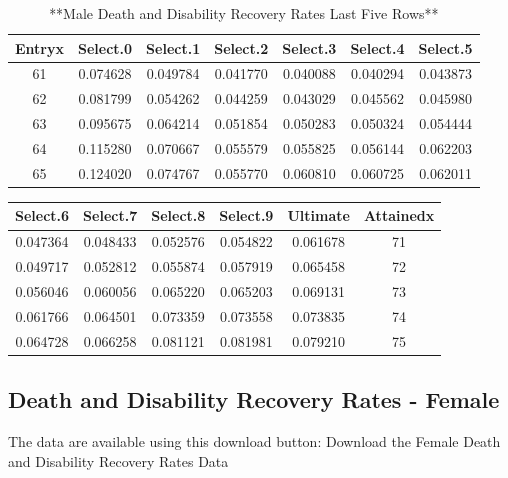 \documentclass[
]{book}
\begin{document}
\begin{table}

\caption{\label{tab:unnamed-chunk-40}**Male Death and Disability Recovery Rates Last Five Rows**}
\centering
\begin{tabular}[t]{c|c|c|c|c|c|c}
\hline
Entryx & Select.0 & Select.1 & Select.2 & Select.3 & Select.4 & Select.5\\
\hline
61 & 0.074628 & 0.049784 & 0.041770 & 0.040088 & 0.040294 & 0.043873\\
\hline
62 & 0.081799 & 0.054262 & 0.044259 & 0.043029 & 0.045562 & 0.045980\\
\hline
63 & 0.095675 & 0.064214 & 0.051854 & 0.050283 & 0.050324 & 0.054444\\
\hline
64 & 0.115280 & 0.070667 & 0.055579 & 0.055825 & 0.056144 & 0.062203\\
\hline
65 & 0.124020 & 0.074767 & 0.055770 & 0.060810 & 0.060725 & 0.062011\\
\hline
\end{tabular}
\end{table}

\begin{tabular}{c|c|c|c|c|c}
\hline
Select.6 & Select.7 & Select.8 & Select.9 & Ultimate & Attainedx\\
\hline
0.047364 & 0.048433 & 0.052576 & 0.054822 & 0.061678 & 71\\
\hline
0.049717 & 0.052812 & 0.055874 & 0.057919 & 0.065458 & 72\\
\hline
0.056046 & 0.060056 & 0.065220 & 0.065203 & 0.069131 & 73\\
\hline
0.061766 & 0.064501 & 0.073359 & 0.073558 & 0.073835 & 74\\
\hline
0.064728 & 0.066258 & 0.081121 & 0.081981 & 0.079210 & 75\\
\hline
\end{tabular}

\hypertarget{death-and-disability-recovery-rates---female}{%
\subsection*{Death and Disability Recovery Rates - Female}\label{death-and-disability-recovery-rates---female}}

The data are available using this download button:
Download the Female Death and Disability Recovery Rates Data
\end{document}
